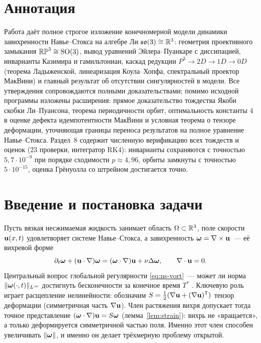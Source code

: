 \needspace{0.25\textheight}
\section*{Аннотация}

Работа даёт полное строгое изложение конечномерной модели динамики завихренности
Навье--Стокса на алгебре Ли $\mathfrak{so}(3) \cong \mathbb{R}^3$: геометрия проективного замыкания
$\mathbb{RP}^3 \cong \mathrm{SO}(3)$, вывод уравнений Эйлера--Пуанкаре с диссипацией,
инварианты Казимира и гамильтониан, каскад редукции $P^3 \to 2D \to 1D \to 0D$
(теорема Ладыженской, линеаризация Коула--Хопфа, спектральный проектор МакВини)
и главный результат об отсутствии сингулярностей в модели. Все утверждения
сопровождаются полными доказательствами; помимо исходной программы изложены
расширения: прямое доказательство тождества Якоби скобки Ли--Пуансона,
теорема периодичности орбит, оптимальность константы $4$ в оценке дефекта
идемпотентности МакВини и условная теорема о тензоре деформации, уточняющая
границы переноса результатов на полное уравнение Навье--Стокса. Раздел~8
содержит численную верификацию всех тождеств и оценок (23 проверки,
интегратор RK4): инварианты сохраняются с точностью $5{,}7\cdot 10^{-9}$
при порядке сходимости $p\approx 4{,}96$, орбиты замкнуты с точностью
$5\cdot 10^{-15}$, оценка Грёнуолла со штрейном достигается точно.

\bigskip

\needspace{0.25\textheight}
\section{Введение и постановка задачи}\label{sec:intro}

Пусть вязкая несжимаемая жидкость занимает область $\Omega \subset \mathbb{R}^3$,
поле скорости $\mathbf{u}(x,t)$ удовлетворяет системе Навье--Стокса, а завихренность
$\boldsymbol{\omega} = \nabla \times \mathbf{u}$~--- её вихревой форме
\begin{equation}\label{eq:ns-vort}
  \partial_t \boldsymbol{\omega} + (\mathbf{u} \cdot \nabla)\boldsymbol{\omega}
  = (\boldsymbol{\omega} \cdot \nabla)\mathbf{u} + \nu \Delta \boldsymbol{\omega},
  \qquad \nabla \cdot \mathbf{u} = 0 .
\end{equation}
Центральный вопрос глобальной регулярности \eqref{eq:ns-vort}~--- может ли норма
$\|\boldsymbol{\omega}(\cdot,t)\|_{L^\infty}$ достигнуть бесконечности за конечное время
$T^{*}$ \cite{fefferman}. Ключевую роль играет расщепление нелинейности:
обозначим $S = \tfrac12(\nabla\mathbf{u} + (\nabla\mathbf{u})^{\mathsf T})$ тензор деформации
(симметричная часть $\nabla\mathbf{u}$). Член растяжения вихря допускает тогда
точное представление $(\boldsymbol{\omega}\cdot\nabla)\mathbf{u} = S\boldsymbol{\omega}$ (лемма~\ref{lem:strain}):
вихрь не «вращается», а только деформируется симметричной частью поля.
Именно этот член способен увеличивать $\|\boldsymbol{\omega}\|$, и именно он делает
трёхмерную проблему открытой.

